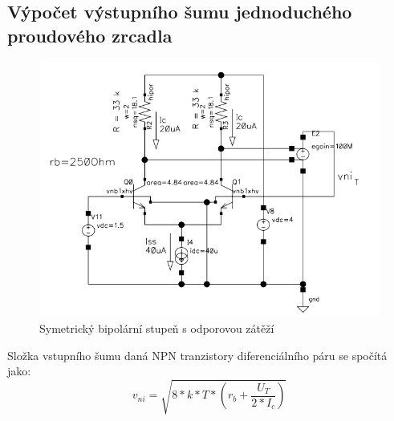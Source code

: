 \subsection{Výpočet výstupního šumu jednoduchého proudového zrcadla}
\begin{figure}[h]
   \begin{center}
     \includegraphics[scale=0.5]{images/symBJT.png}
   \end{center}
   \caption{Symetrický bipolární stupeň s odporovou zátěží}
\end{figure}

Složka vstupního šumu daná NPN tranzistory diferenciálního páru se spočítá jako:
\begin{equation}
v_{ni}=\sqrt{8*k*T*(r_{b}+\frac{U_{T}}{2*I_{c}})}
\end{equation}

